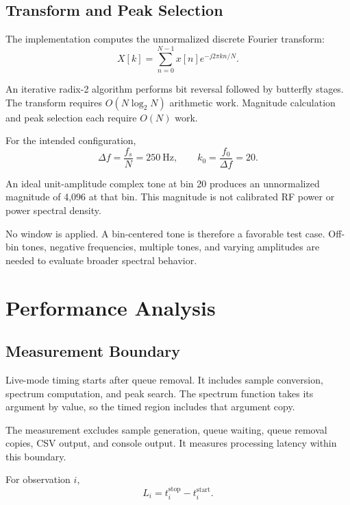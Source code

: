 \documentclass[conference]{IEEEtran}
\begin{document}
\subsection{Transform and Peak Selection}

The implementation computes the unnormalized discrete
Fourier transform:
\begin{equation}
X[k]=\sum_{n=0}^{N-1}x[n]e^{-j2\pi kn/N}.
\end{equation}

An iterative radix-2 algorithm performs bit reversal followed
by butterfly stages. The transform requires
\(O(N\log_2N)\) arithmetic work. Magnitude calculation
and peak selection each require \(O(N)\) work.

For the intended configuration,
\begin{equation}
\Delta f=\frac{f_s}{N}=250\ \mathrm{Hz},
\qquad
k_0=\frac{f_0}{\Delta f}=20.
\end{equation}

An ideal unit-amplitude complex tone at bin 20 produces
an unnormalized magnitude of 4,096 at that bin.
This magnitude is not calibrated RF power or power spectral
density.

No window is applied. A bin-centered tone is therefore
a favorable test case. Off-bin tones, negative frequencies,
multiple tones, and varying amplitudes are needed to
evaluate broader spectral behavior.

\section{Performance Analysis}

\subsection{Measurement Boundary}

Live-mode timing starts after queue removal. It includes
sample conversion, spectrum computation, and peak search.
The spectrum function takes its argument by value, so the
timed region includes that argument copy.

The measurement excludes sample generation, queue waiting,
queue removal copies, CSV output, and console output.
It measures processing latency within this boundary.

For observation \(i\),
\begin{equation}
L_i=t_i^{\mathrm{stop}}-t_i^{\mathrm{start}}.
\end{equation}
\end{document}
